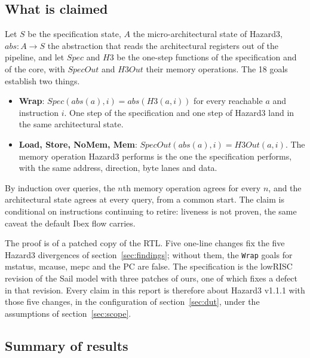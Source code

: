 \documentclass[11pt]{article}
\newcommand{\code}[1]{\texttt{#1}}
\begin{document}
\subsection{What is claimed}

Let $S$ be the specification state, $A$ the micro-architectural state of
Hazard3, $\mathit{abs} : A \to S$ the abstraction that reads the architectural
registers out of the pipeline, and let $\mathit{Spec}$ and $H3$ be the one-step
functions of the specification and of the core, with $\mathit{SpecOut}$ and
$H3\mathit{Out}$ their memory operations. The 18 goals establish two things.

\begin{itemize}
\item \textbf{Wrap}: $\mathit{Spec}(\mathit{abs}(a), i) = \mathit{abs}(H3(a, i))$
  for every reachable $a$ and instruction $i$. One step of the specification and
  one step of Hazard3 land in the same architectural state.
\item \textbf{Load, Store, NoMem, Mem}: $\mathit{SpecOut}(\mathit{abs}(a), i) =
  H3\mathit{Out}(a, i)$. The memory operation Hazard3 performs is the one the
  specification performs, with the same address, direction, byte lanes and data.
\end{itemize}

By induction over queries, the $n$th memory operation agrees for every $n$, and
the architectural state agrees at every query, from a common start. The claim is
conditional on instructions continuing to retire: liveness is not proven, the
same caveat the default Ibex flow carries.

The proof is of a patched copy of the RTL. Five one-line changes fix the five
Hazard3 divergences of section~\ref{sec:findings}; without them, the
\code{Wrap} goals for mstatus, mcause, mepc and the PC are false. The specification is the lowRISC revision of the
Sail model with three patches of ours, one of which fixes a defect in that
revision. Every claim in this report is therefore about Hazard3 v1.1.1 with
those five changes, in the configuration of section~\ref{sec:dut}, under the
assumptions of section~\ref{sec:scope}.

\subsection{Summary of results}
\end{document}
